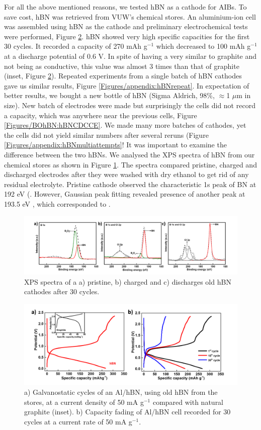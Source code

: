 For all the above mentioned reasons, we tested hBN as a cathode for AIBs. To save cost, hBN was retrieved from VUW's chemical stores. An aluminium-ion cell was assembled using hBN as the cathode and preliminary electrochemical tests were performed, Figure \ref{Figures/BOhBN:hBNiniCDC}. hBN showed very high specific capacities for the first 30 cycles. It recorded a capacity of 270 mAh g$^{-1}$ which decreased to 100 mAh g$^{-1}$ at a discharge potential of 0.6 V. In spite of having a very similar to graphite and not being as conductive, this value was almost 3 times than that of graphite (inset, Figure \ref{Figures/BOhBN:hBNiniCDC}). Repeated experiments from a single batch of hBN cathodes gave us similar results, Figure \ref{Figures/appendix:hBNrepeat}. In expectation of better results, we bought a new bottle of hBN (Sigma Aldrich, 98\%, $\approx$1 $\mu$m in size). New batch of electrodes were made but surprisingly the cells did not record a capacity, which was anywhere near the previous cells, Figure \ref{Figures/BOhBN:hBNCDCCE}. We made many more batches of cathodes, yet the cells did not yield similar numbers after several reruns (Figure \ref{Figures/appendix:hBNmultiattempts}! It was important to examine the difference between the two hBNs. We analysed the XPS spectra of hBN from our chemical stores as shown in Figure \ref{Figures/BOhBN:oldhBNXPS}. The spectra compared pristine, charged and discharged electrodes after they were washed with dry ethanol to get rid of any residual electrolyte. Pristine cathode observed the characteristic 1s peak of BN at 192 eV (. However, Gaussian peak fitting revealed presence of another peak at 193.5 eV , which corresponded to . 
\begin{figure}[tbh!]
\centering
\includegraphics[width=\textwidth]{Figures/BOhBN/oldhBNXPS}
\caption{XPS spectra of a a) pristine, b) charged and c) discharges old hBN cathodes after 30 cycles.}
\label{Figures/BOhBN:oldhBNXPS}
\end{figure}
 \begin{figure}[tbh!]
\centering
\includegraphics[width=\textwidth]{Figures/BOhBN/hBNiniCDC}
\caption{a) Galvanostatic cycles of an Al/hBN, using old hBN from the stores, at a current density of 50 mA g$^{-1}$ compared with natural graphite (inset). b) Capacity fading of Al/hBN cell recorded for 30 cycles at a current rate of 50 mA g$^{-1}$.}
\label{Figures/BOhBN:hBNiniCDC}
\end{figure}
